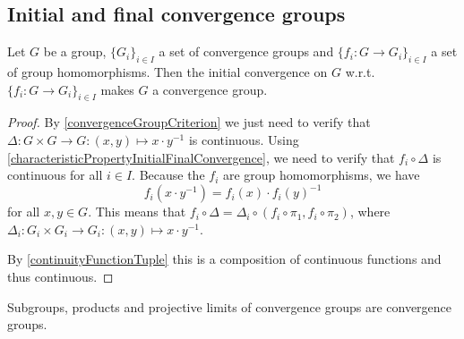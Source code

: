 \subsection{Initial and final convergence groups}
\begin{proposition} \label{initialConvergenceGroup}
Let $G$ be a group, $\{G_i\}_{i\in I}$ a set of convergence groups and $\{f_i: G \to G_i\}_{i\in I}$ a set of group homomorphisms. Then the initial convergence on $G$ w.r.t. $\{f_i: G \to G_i\}_{i\in I}$ makes $G$ a convergence group.
\end{proposition}
\begin{proof}
By \ref{convergenceGroupCriterion} we just need to verify that $\Delta: G\times G \to G: (x,y)\mapsto x\cdot y^{-1}$ is continuous. Using \ref{characteristicPropertyInitialFinalConvergence}, we need to verify that $f_i\circ \Delta$ is continuous for all $i\in I$. Because the $f_i$ are group homomorphisms, we have
\[ f_i(x\cdot y^{-1}) = f_i(x)\cdot f_i(y)^{-1} \]
for all $x, y \in G$. This means that $f_i\circ \Delta = \Delta_i \circ (f_i\circ \pi_1, f_i\circ \pi_2)$, where $\Delta_i: G_i\times G_i \to G_i: (x,y)\mapsto x\cdot y^{-1}$.

By \ref{continuityFunctionTuple} this is a composition of continuous functions and thus continuous.
\end{proof}
\begin{corollary}
Subgroups, products and projective limits of convergence groups are convergence groups.
\end{corollary}

